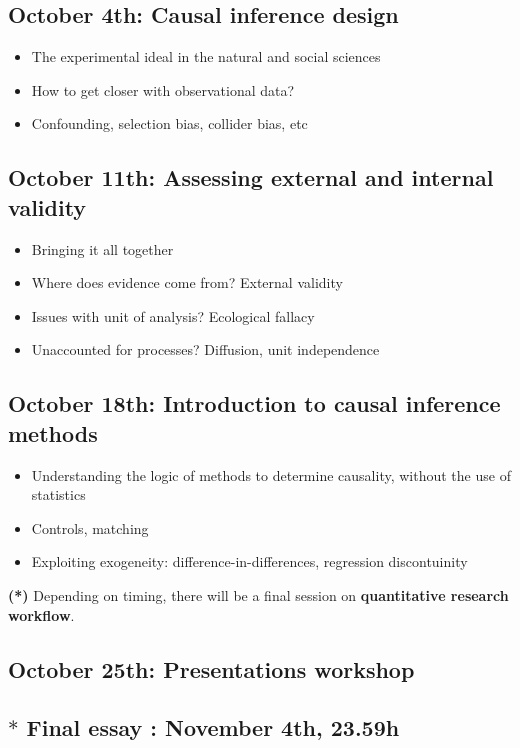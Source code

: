 \documentclass[12pt, a4paper]{article}
\begin{document}
\subsection*{October 4th: Causal inference design}

\begin{itemize}
\setlength\itemsep{-5pt}
  \item The experimental ideal in the natural and social sciences
  \item How to get closer with observational data?
  \item Confounding, selection bias, collider bias, etc
\end{itemize}

\subsection*{October 11th: Assessing external and internal validity}

\begin{itemize}
\setlength\itemsep{-5pt}
  \item Bringing it all together
  \item Where does evidence come from? External validity
  \item Issues with unit of analysis? Ecological fallacy
  \item Unaccounted for processes? Diffusion, unit independence
\end{itemize}

\subsection*{October 18th: Introduction to causal inference methods}

\begin{itemize}
\setlength\itemsep{-5pt}
  \item Understanding the logic of methods to determine causality, without the use of statistics
  \item Controls, matching
  \item Exploiting exogeneity: difference-in-differences, regression discontuinity
\end{itemize}

\noindent
\textbf{(*)} Depending on timing, there will be a final session on \textbf{quantitative research workflow}.

\subsection*{October 25th: Presentations workshop}

\subsection*{$*$ Final essay {\color{red}{deadline}}: November 4th, 23.59h}
\end{document}
